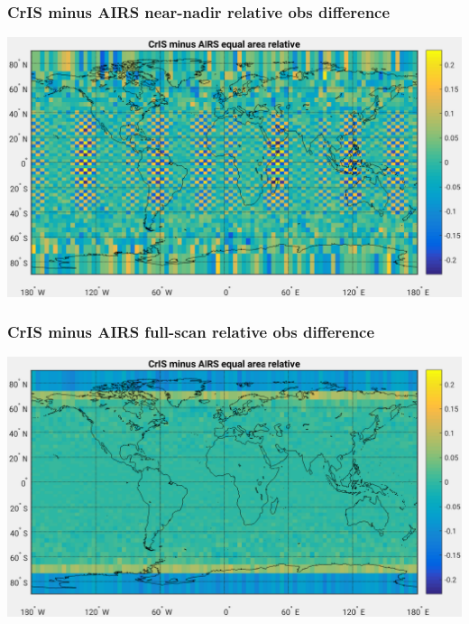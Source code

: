 \documentclass[11pt]{beamer}
\begin{document}
\begin{frame}
\frametitle{CrIS minus AIRS near-nadir relative obs difference}
\begin{center}
  \includegraphics[scale=0.5]{figures/cris_minus_airs_obs_d1s1w1.pdf}
\end{center}
\end{frame} %
\begin{frame}
\frametitle{CrIS minus AIRS full-scan relative obs difference}
\begin{center}
  \includegraphics[scale=0.5]{figures/cris_minus_airs_obs_d1s2w1.pdf}
\end{center}
\end{frame} %
\end{document}
